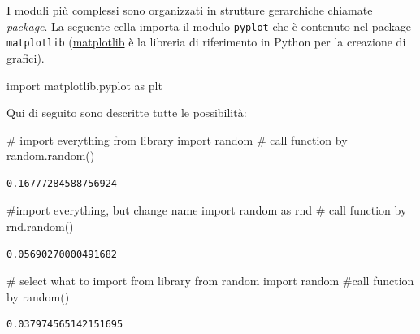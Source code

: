 \documentclass[
  letterpaper,
  krantz2]{{[}./krantz{]}}
\newenvironment{Shaded}{\begin{snugshade}}{\end{snugshade}}
\newcommand{\CommentTok}[1]{\textcolor[rgb]{0.37,0.37,0.37}{#1}}
\newcommand{\ImportTok}[1]{\textcolor[rgb]{0.00,0.46,0.62}{#1}}
\newcommand{\NormalTok}[1]{\textcolor[rgb]{0.00,0.23,0.31}{#1}}
\begin{document}
I moduli più complessi sono organizzati in strutture gerarchiche
chiamate \emph{package}. La seguente cella importa il modulo
\texttt{pyplot} che è contenuto nel package \texttt{matplotlib}
(\href{http://matplotlib.org}{matplotlib} è la libreria di riferimento
in Python per la creazione di grafici).

\begin{Shaded}
\begin{Highlighting}[]
\ImportTok{import}\NormalTok{ matplotlib.pyplot }\ImportTok{as}\NormalTok{ plt}
\end{Highlighting}
\end{Shaded}

Qui di seguito sono descritte tutte le possibilità:

\begin{Shaded}
\begin{Highlighting}[]
\CommentTok{\# import everything from library}
\ImportTok{import}\NormalTok{ random}
\CommentTok{\# call function by}
\NormalTok{random.random()}
\end{Highlighting}
\end{Shaded}

\begin{verbatim}
0.16777284588756924
\end{verbatim}

\begin{Shaded}
\begin{Highlighting}[]
\CommentTok{\#import everything, but change name}
\ImportTok{import}\NormalTok{ random }\ImportTok{as}\NormalTok{ rnd}
\CommentTok{\# call function by}
\NormalTok{rnd.random()}
\end{Highlighting}
\end{Shaded}

\begin{verbatim}
0.05690270000491682
\end{verbatim}

\begin{Shaded}
\begin{Highlighting}[]
\CommentTok{\# select what to import from library}
\ImportTok{from}\NormalTok{ random }\ImportTok{import}\NormalTok{ random}
\CommentTok{\#call function by}
\NormalTok{random()}
\end{Highlighting}
\end{Shaded}

\begin{verbatim}
0.037974565142151695
\end{verbatim}
\end{document}
